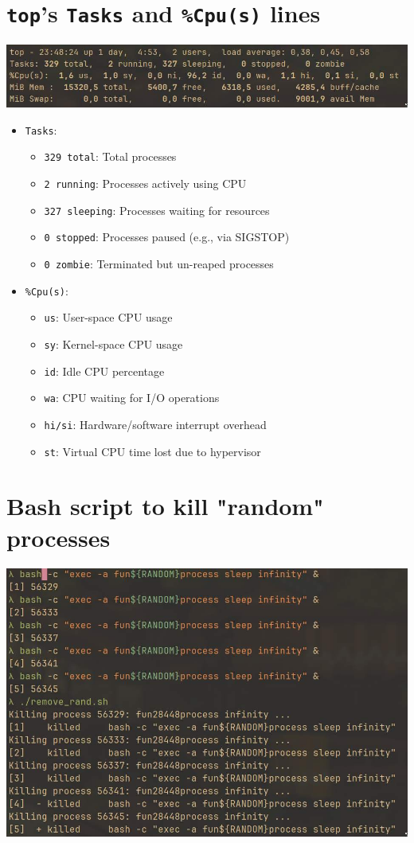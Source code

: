 \documentclass{article}
\newcommand{\code}[1]{\colorbox{light-gray}{\texttt{#1}}}
\begin{document}
\section{\code{top}'s \code{Tasks} and \code{\%Cpu(s)} lines}
\noindent

\includegraphics[width=460pt]{5_2.jpg}

\begin{itemize}
	\item \code{Tasks}:
	      \begin{itemize}
		      \item \code{329 total}: Total processes
		      \item \code{2 running}: Processes actively using CPU
		      \item \code{327 sleeping}: Processes waiting for resources
		      \item \code{0 stopped}: Processes paused (e.g., via SIGSTOP)
		      \item \code{0 zombie}: Terminated but un-reaped processes
	      \end{itemize}
	\item \code{\%Cpu(s)}:
	      \begin{itemize}
		      \item \code{us}: User-space CPU usage
		      \item \code{sy}: Kernel-space CPU usage
		      \item \code{id}: Idle CPU percentage
		      \item \code{wa}: CPU waiting for I/O operations
		      \item \code{hi/si}: Hardware/software interrupt overhead
		      \item \code{st}: Virtual CPU time lost due to hypervisor
	      \end{itemize}
\end{itemize}

\section{Bash script to kill "random" processes}
\noindent

\includegraphics[width=460pt]{5_4.jpg}
\end{document}
